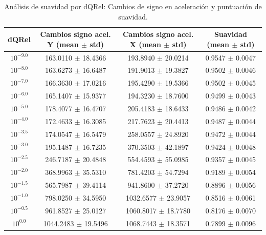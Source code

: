 \begin{table}[htbp]
\centering
\caption{Análisis de suavidad por dQRel: Cambios de signo en aceleración y puntuación de suavidad.}
\label{tab:compare_model_stability}
\begin{tabular}{cccc}
\hline
dQRel & Cambios signo acel. Y (mean $\pm$ std) & Cambios signo acel. X (mean $\pm$ std) & Suavidad (mean $\pm$ std) \\
\hline
$10^{-9.0}$ & 163.0110 $\pm$ 18.4366 & 193.8940 $\pm$ 20.0214 & 0.9547 $\pm$ 0.0047 \\
$10^{-8.0}$ & 163.6273 $\pm$ 16.6487 & 191.9013 $\pm$ 19.3827 & 0.9502 $\pm$ 0.0046 \\
$10^{-7.0}$ & 166.3630 $\pm$ 17.0216 & 195.4290 $\pm$ 19.5366 & 0.9502 $\pm$ 0.0045 \\
$10^{-6.0}$ & 165.1407 $\pm$ 15.9377 & 194.3230 $\pm$ 18.7600 & 0.9499 $\pm$ 0.0043 \\
$10^{-5.0}$ & 178.4077 $\pm$ 16.4707 & 205.4183 $\pm$ 18.6433 & 0.9486 $\pm$ 0.0042 \\
$10^{-4.0}$ & 172.4633 $\pm$ 16.3085 & 217.7623 $\pm$ 20.4413 & 0.9487 $\pm$ 0.0044 \\
$10^{-3.5}$ & 174.0547 $\pm$ 16.5479 & 258.0557 $\pm$ 24.8920 & 0.9472 $\pm$ 0.0044 \\
$10^{-3.0}$ & 195.1487 $\pm$ 16.7235 & 370.3503 $\pm$ 42.1897 & 0.9424 $\pm$ 0.0048 \\
$10^{-2.5}$ & 246.7187 $\pm$ 20.4848 & 554.4593 $\pm$ 55.0985 & 0.9357 $\pm$ 0.0045 \\
$10^{-2.0}$ & 368.9963 $\pm$ 35.5310 & 781.4203 $\pm$ 54.7294 & 0.9189 $\pm$ 0.0054 \\
$10^{-1.5}$ & 565.7987 $\pm$ 39.4114 & 941.8600 $\pm$ 37.2720 & 0.8896 $\pm$ 0.0056 \\
$10^{-1.0}$ & 798.0250 $\pm$ 34.5950 & 1032.6577 $\pm$ 23.9057 & 0.8516 $\pm$ 0.0061 \\
$10^{-0.5}$ & 961.8527 $\pm$ 25.0127 & 1060.8017 $\pm$ 18.7780 & 0.8176 $\pm$ 0.0070 \\
$10^{0.0}$ & 1044.2483 $\pm$ 19.5496 & 1068.7443 $\pm$ 18.3571 & 0.7899 $\pm$ 0.0096 \\
\hline
\end{tabular}
\end{table}
